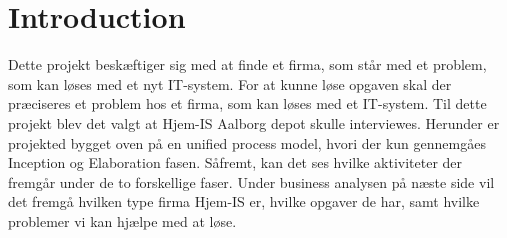 \chapter{Introduction}\label{ch:introduction}
Dette projekt beskæftiger sig med at finde et firma, som står med et problem, som kan løses med et nyt IT-system. For at kunne løse opgaven skal der præciseres et problem hos et firma, som kan løses med et IT-system. Til dette projekt blev det valgt at Hjem-IS Aalborg depot skulle interviewes. Herunder er projekted bygget oven på en unified process model, hvori der kun gennemgåes Inception og Elaboration fasen. Såfremt, kan det ses hvilke aktiviteter der fremgår under de to forskellige faser. Under business analysen på næste side vil det fremgå hvilken type firma Hjem-IS er, hvilke opgaver de har, samt hvilke problemer vi kan hjælpe med at løse. 
